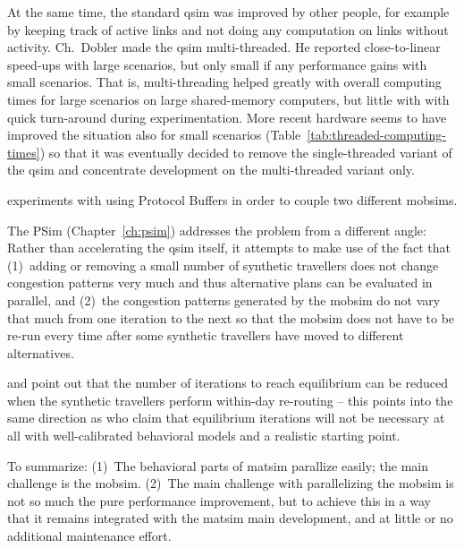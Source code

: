 At the same time, the standard \gls{qsim} was improved by other people, for example by keeping track of active links and not doing any computation on links without activity.  Ch.~Dobler made the \gls{qsim} multi-threaded.  He reported \citep[][Chapter~5]{Dobler_PhDThesis_2013} close-to-linear speed-ups with large scenarios, but only small if any performance gains with small scenarios.  That is, multi-threading helped greatly with overall computing times for large scenarios on large shared-memory computers, but little with with quick turn-around during experimentation.  More recent hardware seems to have improved the situation also for small scenarios (Table~\ref{tab:threaded-computing-times}) so that it was eventually decided to remove the single-threaded variant of the \gls{qsim} and concentrate development on the multi-threaded variant only.  

\cite{LaemmelEtAl2016hybridTRB} experiments with using Protocol Buffers \citep{ProtocolBuffersWww} in order to couple two different \glspl{mobsim}.

The PSim (Chapter~\ref{ch:psim}) addresses the problem from a different angle: Rather than accelerating the \gls{qsim} itself, it attempts to make use of the fact that (1)~adding or removing a small number of synthetic travellers does not change congestion patterns very much and thus alternative plans can be evaluated in parallel, and (2)~the congestion patterns generated by the \gls{mobsim} do not vary that much from one iteration to the next so that the \gls{mobsim} does not have to be re-run every time after some synthetic travellers have moved to different alternatives.

\cite{MaerkiEtAl_Transportation_2014} and \cite{Dobler_PhDThesis_2013} point out that the number of iterations to reach equilibrium can be reduced when the synthetic travellers perform within-day re-routing -- this points into the same direction as \cite{LuEtcBenAkiva2015SimMobility} who claim that equilibrium iterations will not be necessary at all with well-calibrated behavioral models and a realistic starting point.

To summarize: (1)~The behavioral parts of \gls{matsim} parallize easily; the main challenge is the \gls{mobsim}.  (2)~The main challenge with parallelizing the \gls{mobsim} is not so much the pure performance improvement, but to achieve this in a way that it remains integrated with the \gls{matsim} main development, and at little or no additional maintenance effort. 



